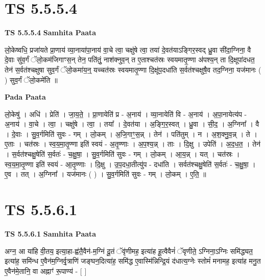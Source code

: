 \documentclass[17pt]{extarticle}
\begin{document}
\section*{ TS 5.5.5.4 }

\textbf{TS 5.5.5.4 } \newline
\textbf{Samhita Paata} \newline

लो॒केष्वधि॒ प्रजा॑यते प्रा॒णाय॑ व्या॒नाया॑पा॒नाय॑ वा॒चे त्वा॒ चक्षु॑षे त्वा॒ तया॑ दे॒वत॑याऽङ्गिर॒स्वद् ध्रु॒वा सी॑दा॒ग्निना॒ वै दे॒वाः सु॑व॒र्गं ॅलो॒कम॑जिगाꣳस॒न् तेन॒ पति॑तुं॒ नाश॑क्नुव॒न् त ए॒ताश्चत॑स्रः स्वयमातृ॒ण्णा अ॑पश्य॒न् ता दि॒क्षूपा॑दधत॒ तेन॑ स॒र्वत॑श्चक्षुषा सुव॒र्गं ॅलो॒कमा॑य॒न्॒ यच्चत॑स्रः स्वयमातृ॒ण्णा दि॒क्षू॑प॒दधा॑ति स॒र्वत॑श्चक्षुषै॒व तद॒ग्निना॒ यज॑मानः ( ) सुव॒र्गं ॅलो॒कमे॑ति ॥ \newline

\textbf{Pada Paata} \newline

लो॒केषु॑ । अधि॑ । प्रेति॑ । जा॒य॒ते॒ । प्रा॒णायेति॑ प्र - अ॒नाय॑ । व्या॒नायेति॑ वि - अ॒नाय॑ । अ॒पा॒नायेत्य॑प - अ॒नाय॑ । वा॒चे । त्वा॒ । चक्षु॑षे । त्वा॒ । तया᳚ । दे॒वत॑या । अ॒ङ्गि॒र॒स्वत् । ध्रु॒वा । सी॒द॒ । अ॒ग्निना᳚ । वै । दे॒वाः । सु॒व॒र्गमिति॑ सुवः - गम् । लो॒कम् । अ॒जि॒गाꣳ॒॒स॒न्न् । तेन॑ । पति॑तुम् । न । अ॒श॒क्नु॒व॒न्न् । ते । ए॒ताः । चत॑स्रः । स्व॒य॒मा॒तृ॒ण्णा इति॑ स्वयं - अ॒तृ॒ण्णाः । अ॒प॒श्य॒न्न् । ताः । दि॒क्षु । उपेति॑ । अ॒द॒ध॒त॒ । तेन॑ । स॒र्वत॑श्चक्षु॒षेति॑ स॒र्वतः॑ - च॒क्षु॒षा॒ । सु॒व॒र्गमिति॑ सुवः - गम् । लो॒कम् । आ॒य॒न्न् । यत् । चत॑स्रः । स्व॒य॒मा॒तृ॒ण्णा इति॑ स्वयं - आ॒तृ॒ण्णाः । दि॒क्षु । उ॒प॒दधा॒तीत्यु॑प - दधा॑ति । सर्वत॑श्चक्षु॒षेति॑ स॒र्वतः॑ - च॒क्षु॒षा॒ । ए॒व । तत् । अ॒ग्निना᳚ । यज॑मानः ( ) । सु॒व॒र्गमिति॑ सुवः - गम् । लो॒कम् । ए॒ति॒ ॥  \newline




\section*{ TS 5.5.6.1 }

\textbf{TS 5.5.6.1 } \newline
\textbf{Samhita Paata} \newline

अग्न॒ आ या॑हि वी॒तय॒ इत्या॒हा-ह्व॑तै॒वैन॑-म॒ग्निं दू॒तं ॅवृ॑णीमह॒ इत्या॑ह हू॒त्वैवैनं॑ ॅवृणीते॒ ऽग्निना॒ऽग्निः समि॑द्ध्यत॒ इत्या॑ह॒ समि॑न्ध ए॒वैन॑म॒ग्निर्वृ॒त्राणि॑ जङ्घन॒दित्या॑ह॒ समि॑द्ध ए॒वास्मि॑न्निन्द्रि॒यं द॑धात्य॒ग्नेः स्तोमं॑ मनामह॒ इत्या॑ह मनु॒त ए॒वैन॑मे॒तानि॒ वा अह्नाꣳ॑ रू॒पाण्य॑ - [  ] \newline
\end{document}
